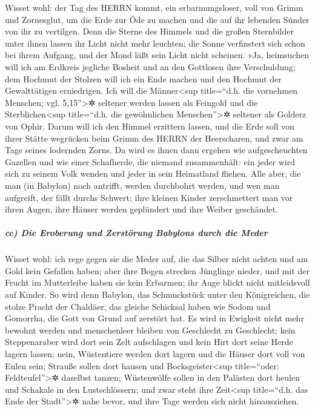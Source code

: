 Wisset wohl: der Tag des HERRN kommt, ein erbarmungsloser,
voll von Grimm und Zornesglut, um die Erde zur Öde zu machen und die auf
ihr lebenden Sünder von ihr zu vertilgen. Denn die Sterne
des Himmels und die großen Sternbilder unter ihnen lassen ihr Licht
nicht mehr leuchten; die Sonne verfinstert sich schon bei ihrem Aufgang,
und der Mond läßt sein Licht nicht scheinen. »Ja,
heimsuchen will ich am Erdkreis jegliche Bosheit und an den Gottlosen
ihre Verschuldung; dem Hochmut der Stolzen will ich ein Ende machen und
den Hochmut der Gewalttätigen erniedrigen. Ich will die
Männer\textless sup title=``d.h. die vornehmen Menschen; vgl.
5,15''\textgreater✲ seltener werden lassen als Feingold und die
Sterblichen\textless sup title=``d.h. die gewöhnlichen
Menschen''\textgreater✲ seltener als Golderz von Ophir.
Darum will ich den Himmel erzittern lassen, und die Erde
soll von ihrer Stätte wegrücken beim Grimm des HERRN der Heerscharen,
und zwar am Tage seines lodernden Zorns. Da wird es ihnen
dann ergehen wie aufgescheuchten Gazellen und wie einer Schafherde, die
niemand zusammenhält: ein jeder wird sich zu seinem Volk wenden und
jeder in sein Heimatland fliehen. Alle aber, die man (in
Babylon) noch antrifft, werden durchbohrt werden, und wen man aufgreift,
der fällt durchs Schwert; ihre kleinen Kinder
zerschmettert man vor ihren Augen, ihre Häuser werden geplündert und
ihre Weiber geschändet.

\hypertarget{cc-die-eroberung-und-zerstuxf6rung-babylons-durch-die-meder}{%
\subparagraph{cc) Die Eroberung und Zerstörung Babylons durch die
Meder}\label{cc-die-eroberung-und-zerstuxf6rung-babylons-durch-die-meder}}

Wisset wohl: ich rege gegen sie die Meder auf, die das
Silber nicht achten und am Gold kein Gefallen haben; aber
ihre Bogen strecken Jünglinge nieder, und mit der Frucht im Mutterleibe
haben sie kein Erbarmen; ihr Auge blickt nicht mitleidsvoll auf Kinder.
So wird denn Babylon, das Schmuckstück unter den
Königreichen, die stolze Pracht der Chaldäer, das gleiche Schicksal
haben wie Sodom und Gomorrha, die Gott von Grund auf zerstört hat.
Es wird in Ewigkeit nicht mehr bewohnt werden und
menschenleer bleiben von Geschlecht zu Geschlecht; kein Steppenaraber
wird dort sein Zelt aufschlagen und kein Hirt dort seine Herde lagern
lassen; nein, Wüstentiere werden dort lagern und die
Häuser dort voll von Eulen sein; Strauße sollen dort hausen und
Bocksgeister\textless sup title=``oder: Feldteufel''\textgreater✲
daselbst tanzen; Wüstenwölfe sollen in den Palästen dort
heulen und Schakale in den Lustschlössern; und zwar steht ihre
Zeit\textless sup title=``d.h. das Ende der Stadt''\textgreater✲ nahe
bevor, und ihre Tage werden sich nicht hinausziehen.

